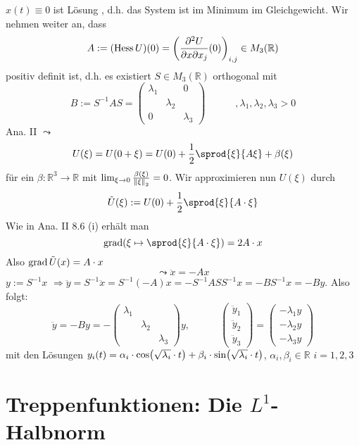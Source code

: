 $x(t)\equiv 0$ ist Lösung , d.h. das System ist im Minimum im Gleichgewicht. Wir nehmen weiter an, dass 
\[
	A := ( \hess U)(0) = \enbrace*{ \frac{\partial^2 U}{\partial x \partial x_j} (0)}_{i,j} \in M_3(\mathds{R})  
\]
positiv definit ist, d.h. es existiert $S \in M_3(\mathds{R})$ orthogonal mit 
\[
	B := S ^{-1} A S = \begin{pmatrix}
		\lambda_1 & & 0 \\
		& \lambda_2 & \\
		0 & & \lambda_3
	\end{pmatrix} \qquad \quad , \lambda_1, \lambda_2, \lambda_3 >0
\]
Ana. II $\leadsto$
\[
	U(\xi)= U(0 + \xi) = U(0) + \frac{1}{2} \sprod{\xi}{A \xi} + \beta(\xi)  
\]
für ein $\beta : \mathds{R}^3 \to \mathds{R}$ mit $\lim_{ \xi \to 0} \frac{\beta(\xi)}{\norm[2]{\xi} } = 0 $. Wir approximieren nun $U(\xi)$ durch 
\[
	\tilde U (\xi) := U(0)+ \frac{1}{2} \sprod{\xi}{A \cdot \xi} 
\]
Wie in Ana. II 8.6 (i) erhält man 
\[
	\grad\enbrace*{\xi \mapsto \sprod{\xi}{A \cdot \xi} }  = 2 A \cdot x
\]
Also $\grad \tilde U (x) = A \cdot x$
\[
	\leadsto \ddot x = - A x
\]
$y := S ^{-1} x$ $\Rightarrow \ddot y = S ^{-1} \ddot x  = S ^{-1} (-A)x =- S ^{-1} A S S ^{-1} x = - B S ^{-1}  x = -B y$. Also folgt:
\[
	\ddot y = - B y = - \begin{pmatrix}
		\lambda_1 & & \\
		& \lambda_2 & \\
		& & \lambda_3
	\end{pmatrix}y, \qquad \quad \begin{pmatrix}
		\ddot y_1 \\
		\ddot y_2 \\
		\ddot y_3
	\end{pmatrix} = \begin{pmatrix}
		-\lambda_1 y \\
		-\lambda_2 y \\
		- \lambda_3 y
	\end{pmatrix}
\]
mit den Lösungen $y_i(t) = \alpha_i \cdot  \cos \enbrace*{\sqrt{\lambda_i}\cdot t  } + \beta_i \cdot \sin \enbrace*{\sqrt{\lambda_i} \cdot t  } $, $\alpha_i, \beta_i \in \mathds{R}$
$i=1,2,3$
\newpage

\section{Treppenfunktionen: Die $L^1$-Halbnorm} %
\label{sec:3}


